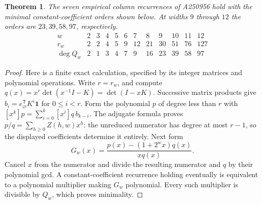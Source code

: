 \documentclass[11pt]{article}
\newtheorem{theorem}{Theorem}
\begin{document}
\begin{theorem}
The seven empirical column recurrences of A250956 hold with the minimal constant-coefficient orders shown below. At widths $9$ through $12$ the orders are $23,39,58,97$, respectively.
\[
\begin{array}{c|rrrrrrrrrrr}
w&2&3&4&5&6&7&8&9&10&11&12\\ \hline
r_w&2&2&4&5&9&12&21&30&51&76&127\\
\deg Q_w&2&1&3&4&7&9&16&23&39&58&97
\end{array}
\]
\end{theorem}
\begin{proof}
Here is a finite exact calculation, specified by its integer matrices and polynomial operations. Write $r=r_w$, and compute $q(x)=x^r\det(x^{-1}I-K)=\det(I-xK)$. Successive matrix products give $b_i=e_{\varnothing}^{\mathsf T}K^i\mathbf1$ for $0\leq i<r$. Form the polynomial $p$ of degree less than $r$ with $[x^k]p=\sum_{i=0}^k [x^i]q\, b_{k-i}$. The adjugate formula proves $p/q=\sum_{h\ge0}Z(h,w)x^h$: the unreduced numerator has degree at most $r-1$, so the displayed coefficients determine it entirely. Next form
\[
 G_w(x)=\frac{p(x)-(1+2^w x)q(x)}{xq(x)}.
\]
Cancel $x$ from the numerator and divide the resulting numerator and $q$ by their polynomial gcd. A constant-coefficient recurrence holding eventually is equivalent to a polynomial multiplier making $G_w$ polynomial. Every such multiplier is divisible by $Q_w$, which proves minimality.


\end{proof}
\end{document}

